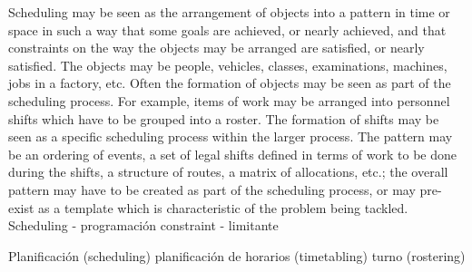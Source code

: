 \documentclass[draft,12pt,headsepline,footsepline,paper=letter]{scrreprt}
\begin{document}
\iffalse
Scheduling may be seen as the arrangement of objects into a pattern in time or space in such a way that some goals are achieved, or nearly achieved, and that constraints on the way the objects may be arranged are satisfied, or nearly satisfied.
The objects may be people, vehicles, classes, examinations, machines, jobs in a factory, etc. Often the formation of objects may be seen as part of the scheduling process. For example, items of work may be arranged into personnel shifts which have to be grouped into a roster. The formation of shifts may be seen as a specific scheduling process within the larger process.
The pattern may be an ordering of events, a set of legal shifts defined in terms of work to be done during the shifts, a structure of routes, a matrix of allocations, etc.; the overall pattern may have to be created as part of the scheduling process, or may pre-exist as a template which is characteristic of the problem being tackled.
Scheduling - programación
constraint - limitante

Planificación (scheduling)
planificación de horarios (timetabling)
turno (rostering)
\end{document}
